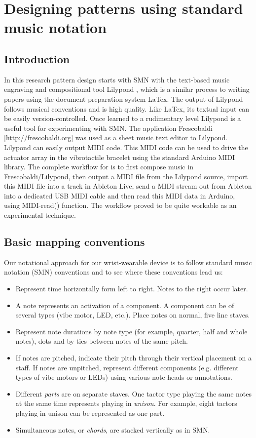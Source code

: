 \documentclass[a4paper, twocolumn]{article}
\begin{document}
\section{Designing patterns using standard music notation}

\subsection{Introduction}
In this research pattern design starts with SMN with the text-based music engraving and compositional tool Lilypond \cite{nienhuys2003lilypond}, which is a similar process to writing papers using the document preparation system LaTex. The output of Lilypond follows musical conventions and is high quality. Like LaTex, its textual input can be easily version-controlled. Once learned to a rudimentary level Lilypond is a useful tool for experimenting with SMN.  The application Frescobaldi [http://frescobaldi.org] was used as a sheet music text editor to Lilypond. Lilypond can easily output MIDI code. This MIDI code can be used to drive the actuator array in the vibrotactile bracelet using the standard Arduino MIDI library. The complete workflow for is to first compose music in Frescobaldi/Lilypond, then output a MIDI file from the Lilypond source, import this MIDI file into a track in Ableton Live, send a MIDI stream out from Ableton into a dedicated USB MIDI cable and then read this MIDI data in Arduino, using MIDI-read() function. The workflow proved to be quite workable as an experimental technique.

\subsection{Basic mapping conventions}
Our notational approach for our wrist-wearable device is to follow standard music notation (SMN) conventions and to see where these conventions lead us:

\begin{itemize}
\item Represent time horizontally form left to right. Notes to the right occur later.
\item A note represents an activation of a component. A component can be of several types (vibe motor, LED, etc.). Place notes on normal, five line staves.
\item Represent note durations by note type (for example, quarter, half and whole notes), dots and by ties between notes of the same pitch.
\item If notes are pitched, indicate their pitch through their vertical placement on a staff. If notes are unpitched, represent different components (e.g. different types of vibe motors or LEDs) using various note heads or annotations.
\item Different \textit{parts} are on separate staves. One tactor type playing the same notes at the same time represents playing in \textit{unison}. For example, eight tactors playing in unison can be represented as one part.
\item Simultaneous notes, or \textit{chords}, are stacked vertically as in SMN.
\end{itemize}
\end{document}
